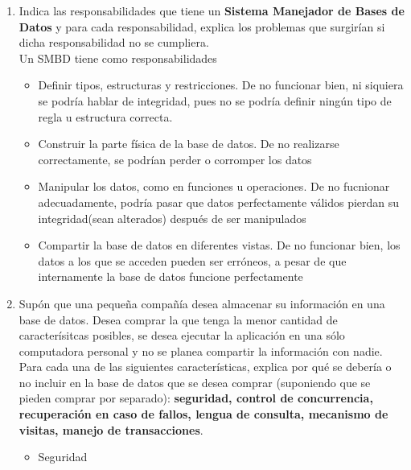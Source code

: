 \documentclass{article}
\begin{document}
\begin{enumerate}[label=\alph*.]
{            \stopchronology
            }
        \item {
            Indica las responsabilidades que tiene un \textbf{Sistema Manejador
            de Bases de Datos} y para cada responsabilidad, explica los problemas
            que surgirían si dicha responsabilidad no se cumpliera. \\
            Un SMBD tiene como responsabilidades
            \begin{itemize}
                \item {Definir tipos, estructuras y restricciones. De no 
                funcionar bien, ni siquiera se podría hablar de integridad, pues
                no se podría definir ningún tipo de regla u estructura correcta.}
                \item {Construir la parte física de la base de datos. De no 
                realizarse correctamente, se podrían perder o corromper los datos}
                \item {Manipular los datos, como en funciones u operaciones. De
                no fucnionar adecuadamente, podría pasar que datos perfectamente
                válidos pierdan su integridad(sean alterados) después de ser 
                manipulados}
                \item {Compartir la base de datos en diferentes vistas. De no 
                funcionar bien, los datos a los que se acceden pueden ser erróneos,
                a pesar de que internamente la base de datos funcione 
                perfectamente}
            \end{itemize}
        }
        \item {
            Supón que una pequeña compañía desea almacenar su información en una
            base de datos. Desea comprar la que tenga la menor cantidad de 
            caracterísitcas posibles, se desea ejecutar la aplicación en una 
            sólo computadora personal y no se planea compartir la información con
            nadie. Para cada una de las siguientes características, explica por
            qué se debería o no incluir en la base de datos que se desea comprar
            (suponiendo que se pieden comprar por separado): \textbf{seguridad, 
            control de concurrencia, recuperación en caso de fallos, lengua de 
            consulta, mecanismo de visitas, manejo de transacciones}.
            \begin{itemize}
                \item {Seguridad \\
}
\end{itemize}}
\end{enumerate}
\end{document}
